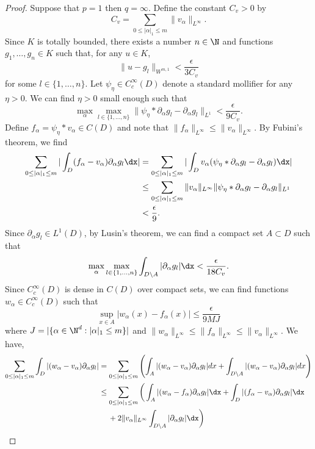 \begin{proof}
Suppose that \(p=1\) then \(q=\infty\). Define the constant \(C_v > 0\) by
\[C_v = \sum_{0 \leq |\alpha|_1 \leq m} \|v_\alpha\|_{L^\infty}.\]
Since \(K\) is totally bounded, there exists a number
\(n \in \N\) and functions \(g_1,\dots,g_n \in K\) such that, for any \(u \in K\),
\[\|u - g_l\|_{W^{m,1}} < \frac{\epsilon}{3C_v}\]
for some \(l \in \{1,\dots,n\}\). 
Let \(\psi_\eta \in C^\infty_c (D)\) denote a standard mollifier
for any \(\eta > 0\). We can find \(\eta > 0\) small enough such that
\[\max_{\alpha} \max_{l \in \{1,\dots,n\}} \|\psi_\eta * \partial_\alpha g_l - \partial_\alpha g_l\|_{L^1} < \frac{\epsilon}{9 C_v}.\]
Define \(f_\alpha = \psi_\eta * v_\alpha \in C(D)\) and note that \(\|f_\alpha\|_{L^\infty} \leq \|v_\alpha\|_{L^\infty}\). By Fubini's theorem, we find
\begin{align*}
\sum_{0 \leq |\alpha|_1 \leq m} |\int_D (f_\alpha - v_\alpha) \partial_\alpha g_l \dx| &= \sum_{0 \leq |\alpha|_1 \leq m} |\int_D v_\alpha ( \psi_\eta * \partial_\alpha g_l - \partial_\alpha g_l) \dx| \\
&\leq \sum_{0 \leq |\alpha|_1 \leq m} \|v_\alpha\|_{L^\infty} \|\psi_\eta * \partial_\alpha g_l - \partial_\alpha g_l\|_{L^1} \\
&< \frac{\epsilon}{9}.
\end{align*}
Since \(\partial_\alpha g_l \in L^1 (D)\), by Lusin's theorem, we can find a compact set \(A \subset D\) such that
\[\max_\alpha \max_{l \in \{1,\dots,n\}}  \int_{D \setminus A} |\partial_\alpha g_l| \dx < \frac{\epsilon}{18 C_v}.\]
Since \(C^\infty_c (D)\) is dense in \(C(D)\) over compact sets, we can find functions \(w_\alpha \in C^\infty_c (D)\) such that
\[\sup_{x \in A} |w_\alpha (x) - f_\alpha (x)| \leq \frac{\epsilon}{9M J}\]
where \(J = |\{\alpha \in \N^d : |\alpha|_1 \leq m \}|\) and \(\|w_\alpha\|_{L^\infty} \leq \|f_\alpha\|_{L^\infty} \leq \|v_\alpha\|_{L^\infty}\).
We have,
\begin{align*}
\sum_{0 \leq |\alpha|_1 \leq m} \int_D |(w_\alpha - v_\alpha) \partial_\alpha g_l| &= \sum_{0 \leq |\alpha|_1 \leq m} \left (  \int_A |(w_\alpha - v_\alpha) \partial_\alpha g_l| dx + 
\int_{D \setminus A} |(w_\alpha - v_\alpha) \partial_\alpha g_l| dx \right )\\
&\leq \sum_{0 \leq |\alpha|_1 \leq m} \bigg ( \int_A |(w_\alpha - f_\alpha) \partial_\alpha g_l| \dx + \int_D |(f_\alpha -v_\alpha) \partial_\alpha g_l| \dx \\
&\quad \: + 2 \|v_\alpha\|_{L^\infty} \int_{D \setminus A} |\partial_\alpha g_l| \dx \bigg ) \\

\end{align*}
\end{proof}
